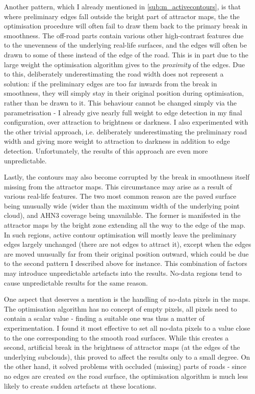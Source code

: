 Another pattern, which I already mentioned in \ref{sub:m_activecontours}, is that where preliminary edges fall outside the bright part of attractor maps, the the optimisation procedure will often fail to draw them back to the primary break in smoothness. The off-road parts contain various other high-contrast features due to the unevenness of the underlying real-life surfaces, and the edges will often be drawn to some of these instead of the edge of the road. This is in part due to the large weight the optimisation algorithm gives to the \textit{proximity} of the edges. Due to this, deliberately underestimating the road width does not represent a solution: if the preliminary edges are too far inwards from the break in smoothness, they will simply stay in their original position during optimisation, rather than be drawn to it. This behaviour cannot be changed simply via the parametrisation - I already give nearly full weight to edge detection in my final configuration, over attraction to brightness or darkness. I also experimented with the other trivial approach, i.e. deliberately underestimating the preliminary road width and giving more weight to attraction to darkness in addition to edge detection. Unfortunately, the results of this approach are even more unpredictable.

Lastly, the contours may also become corrupted by the break in smoothness itself missing from the attractor maps. This circumstance may arise as a result of various real-life features. The two most common reason are the paved surface being unusually wide (wider than the maximum width of the underlying point cloud), and AHN3 coverage being unavailable. The former is manifested in the attractor maps by the bright zone extending all the way  to the edge of the map. In such regions, active contour optimisation will mostly leave the preliminary edges largely unchanged (there are not edges to attract it), except when the edges are moved unusually far from their original position outward, which could be due to the second pattern I described above for instance. This combination of factors may introduce unpredictable artefacts into the results. No-data regions tend to cause unpredictable results for the same reason.

One aspect that deserves a mention is the handling of no-data pixels in the maps. The optimisation algorithm has no concept of empty pixels, all pixels need to contain a scalar value - finding a suitable one was thus a matter of experimentation. I found it most effective to set all no-data pixels to a value close to the one corresponding to the smooth road surfaces. While this creates a second, artificial break in the brightness of attractor maps (at the edges of the underlying subclouds), this proved to affect the results only to a small degree. On the other hand, it solved problems with occluded (missing) parts of roads - since no edges are created \textit{on} the road surface, the optimisation algorithm is much less likely to create sudden artefacts at these locations.

